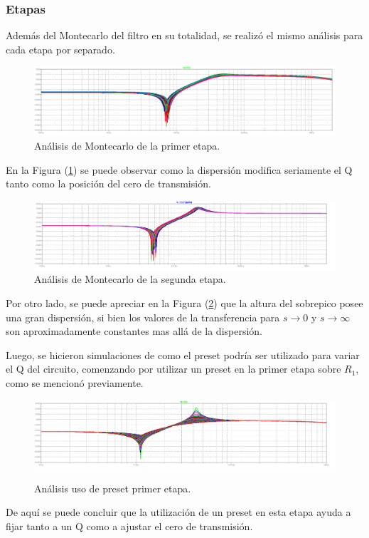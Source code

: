 \subsubsection{Etapas}
Además del Montecarlo del filtro en su totalidad, se realizó el mismo análisis para cada etapa por separado.
\begin{figure}[H]
	\centering
	\includegraphics[width=\textwidth]{Imagenes-Ej3/mcsedraE1.png}
	\caption{Análisis de Montecarlo de la primer etapa.}
	\label{fig:mcsedrae1}
\end{figure}
En la Figura (\ref{fig:mcsedrae1}) se puede observar como la dispersión modifica seriamente el Q tanto como la posición del cero de transmisión.
\begin{figure}[H]
	\centering
	\includegraphics[width=\textwidth]{Imagenes-Ej3/mcsedraE2.png}
	\caption{Análisis de Montecarlo de la segunda etapa.}
	\label{fig:mcsedrae2}
\end{figure}
Por otro lado, se puede apreciar en la Figura (\ref{fig:mcsedrae2}) que la altura del sobrepico posee una gran dispersión, si bien los valores de la transferencia para $s\rightarrow 0$ y $s\rightarrow \infty$ son aproximadamente constantes mas allá de la dispersión.

Luego, se hicieron simulaciones de como el preset podría ser utilizado para variar el Q del circuito, comenzando por utilizar un preset en la primer etapa sobre $R_1$, como se mencionó previamente.
\begin{figure}[H]
	\centering
	\includegraphics[width=\textwidth]{Imagenes-Ej3/mcPoteR6E1.png}
	\label{fig:presete1}
	\caption{Análisis uso de preset primer etapa.}
\end{figure}
De aquí se puede concluir que la utilización de un preset en esta etapa ayuda a fijar tanto a un Q como a ajustar el cero de transmisión.

